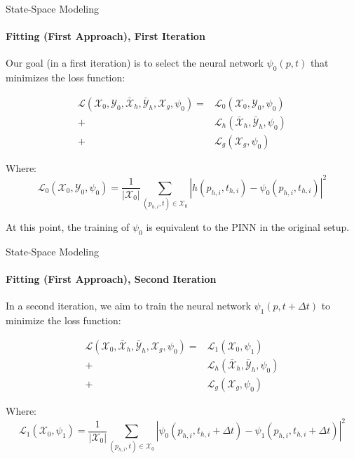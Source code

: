\begin{frame}{State-Space Modeling}
\framesubtitle{Fitting (First Approach), First Iteration}

Our goal (in a first iteration) is to select the neural network $\psi_0(p, t)$ that minimizes the loss function:

\begin{align*}
    \mathcal{L}(\mathcal{X}_0, \mathcal{Y}_0, \bar{\mathcal{X}}_h, \bar{\mathcal{Y}}_h,\mathcal{X}_g, \psi_0) =& \mathcal{L}_0 (\mathcal{X}_0, \mathcal{Y}_0, \psi_0) \\
    +& \mathcal{L}_h (\bar{\mathcal{X}}_h, \bar{\mathcal{Y}}_h, \psi_0) \\
    +& \mathcal{L}_g (\mathcal{X}_g, \psi_0)
\end{align*}

Where:
\begin{equation}
    \mathcal{L}_0 (\mathcal{X}_0, \mathcal{Y}_0, \psi_0) = \frac{1}{|\mathcal{X}_0|} \sum_{(p_{h,i}, t) \in \mathcal{X}_0} \left| h(p_{h,i}, t_{h,i}) - \psi_0(p_{h,i}, t_{h,i})  \right|^2
\end{equation}

At this point, the training of $\psi_0$ is equivalent to the PINN in the original setup. 

\end{frame}

\begin{frame}{State-Space Modeling}
\framesubtitle{Fitting (First Approach), Second Iteration}

In a second iteration, we aim to train the neural network $\psi_1(p, t + \Delta t)$ to minimize the loss function:

\begin{align*}
    \mathcal{L}(\mathcal{X}_0, \bar{\mathcal{X}}_h, \bar{\mathcal{Y}}_h,\mathcal{X}_g, \psi_0) =& \mathcal{L}_1 (\mathcal{X}_0, \psi_1) \\
    +& \mathcal{L}_h (\bar{\mathcal{X}}_h, \bar{\mathcal{Y}}_h, \psi_0) \\
    +& \mathcal{L}_g (\mathcal{X}_g, \psi_0)
\end{align*}

Where:
\begin{equation}
    \mathcal{L}_1 (\mathcal{X}_0, \psi_1) = \frac{1}{|\mathcal{X}_0|} \sum_{(p_{h,i}, t) \in \mathcal{X}_0} \left| \psi_0(p_{h,i}, t_{h,i} + \Delta t) - \psi_1(p_{h,i}, t_{h,i} + \Delta t)  \right|^2
\end{equation}

\end{frame}

